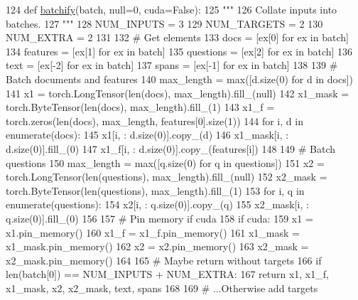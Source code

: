 \begin{DoxyCode}
124 \textcolor{keyword}{def }\hyperlink{namespaceparlai_1_1agents_1_1drqa_1_1utils_aca22dd97c5b6dcda2a7479c1cb22ef1e}{batchify}(batch, null=0, cuda=False):
125     \textcolor{stringliteral}{"""}
126 \textcolor{stringliteral}{    Collate inputs into batches.}
127 \textcolor{stringliteral}{    """}
128     NUM\_INPUTS = 3
129     NUM\_TARGETS = 2
130     NUM\_EXTRA = 2
131 
132     \textcolor{comment}{# Get elements}
133     docs = [ex[0] \textcolor{keywordflow}{for} ex \textcolor{keywordflow}{in} batch]
134     features = [ex[1] \textcolor{keywordflow}{for} ex \textcolor{keywordflow}{in} batch]
135     questions = [ex[2] \textcolor{keywordflow}{for} ex \textcolor{keywordflow}{in} batch]
136     text = [ex[-2] \textcolor{keywordflow}{for} ex \textcolor{keywordflow}{in} batch]
137     spans = [ex[-1] \textcolor{keywordflow}{for} ex \textcolor{keywordflow}{in} batch]
138 
139     \textcolor{comment}{# Batch documents and features}
140     max\_length = max([d.size(0) \textcolor{keywordflow}{for} d \textcolor{keywordflow}{in} docs])
141     x1 = torch.LongTensor(len(docs), max\_length).fill\_(null)
142     x1\_mask = torch.ByteTensor(len(docs), max\_length).fill\_(1)
143     x1\_f = torch.zeros(len(docs), max\_length, features[0].size(1))
144     \textcolor{keywordflow}{for} i, d \textcolor{keywordflow}{in} enumerate(docs):
145         x1[i, : d.size(0)].copy\_(d)
146         x1\_mask[i, : d.size(0)].fill\_(0)
147         x1\_f[i, : d.size(0)].copy\_(features[i])
148 
149     \textcolor{comment}{# Batch questions}
150     max\_length = max([q.size(0) \textcolor{keywordflow}{for} q \textcolor{keywordflow}{in} questions])
151     x2 = torch.LongTensor(len(questions), max\_length).fill\_(null)
152     x2\_mask = torch.ByteTensor(len(questions), max\_length).fill\_(1)
153     \textcolor{keywordflow}{for} i, q \textcolor{keywordflow}{in} enumerate(questions):
154         x2[i, : q.size(0)].copy\_(q)
155         x2\_mask[i, : q.size(0)].fill\_(0)
156 
157     \textcolor{comment}{# Pin memory if cuda}
158     \textcolor{keywordflow}{if} cuda:
159         x1 = x1.pin\_memory()
160         x1\_f = x1\_f.pin\_memory()
161         x1\_mask = x1\_mask.pin\_memory()
162         x2 = x2.pin\_memory()
163         x2\_mask = x2\_mask.pin\_memory()
164 
165     \textcolor{comment}{# Maybe return without targets}
166     \textcolor{keywordflow}{if} len(batch[0]) == NUM\_INPUTS + NUM\_EXTRA:
167         \textcolor{keywordflow}{return} x1, x1\_f, x1\_mask, x2, x2\_mask, text, spans
168 
169     \textcolor{comment}{# ...Otherwise add targets}

\end{DoxyCode}
